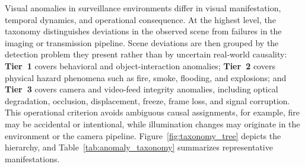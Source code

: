 \documentclass[10pt,a4paper]{article}
\begin{document}
Visual anomalies in surveillance environments differ in visual manifestation, temporal dynamics, and operational consequence. At the highest level, the taxonomy distinguishes deviations in the observed scene from failures in the imaging or transmission pipeline. Scene deviations are then grouped by the detection problem they present rather than by uncertain real-world causality: \textbf{Tier~1} covers behavioral and object-interaction anomalies; \textbf{Tier~2} covers physical hazard phenomena such as fire, smoke, flooding, and explosions; and \textbf{Tier~3} covers camera and video-feed integrity anomalies, including optical degradation, occlusion, displacement, freeze, frame loss, and signal corruption. This operational criterion avoids ambiguous causal assignments, for example, fire may be accidental or intentional, while illumination changes may originate in the environment or the camera pipeline. Figure~\ref{fig:taxonomy_tree} depicts the hierarchy, and Table~\ref{tab:anomaly_taxonomy} summarizes representative manifestations.
\end{document}
